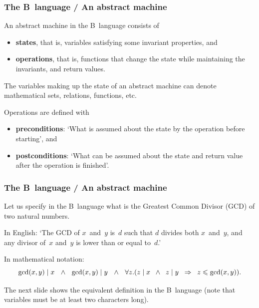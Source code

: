 \documentclass[compress,dvipdfmx]{beamer}
\begin{document}
\begin{frame}
  \frametitle{The B~language / An abstract machine}

  An abstract machine in the B~language consists of
  \begin{itemize}

    \item \textbf{states}, that is, variables satisfying some
      invariant properties, and

    \item \textbf{operations}, that is, functions that change the
      state while maintaining the invariants, and return values.

  \end{itemize}

  \bigskip

  The variables making up the state of an abstract machine can denote
  mathematical sets, relations, functions, etc.

  \bigskip

  Operations are defined with
  \begin{itemize}

    \item \textbf{preconditions}: `What is assumed about the state by
      the operation before starting', and

    \item \textbf{postconditions}: `What can be assumed about the
      state and return value after the operation is finished'.

  \end{itemize}

\end{frame}


\begin{frame}
  \frametitle{The B~language / An abstract machine}

  Let us specify in the B~language what is the Greatest Common Divisor
  (GCD) of two natural numbers.

  \bigskip

  In English: `The GCD of \(x\)~and~\(y\) is~\(d\) such that \(d\)
  divides both \(x\)~and~\(y\), and any divisor of~\(x\) and~\(y\) is
  lower than or equal to~\(d\).'

  \bigskip

  In mathematical notation:
  \begin{equation*}
    \tiny
    \gcd(x,y) \mid x \quad\land\quad
    \gcd(x,y) \mid y \quad\wedge\quad
    \forall z.(z \mid x \;\;\wedge\;\; z \mid y
    \;\; \Rightarrow\;\; z \leqslant \gcd(x,y)).
  \end{equation*}

  The next slide shows the equivalent definition in the B~language
  (note that variables must be at least two characters long).

\end{frame}
\end{document}
